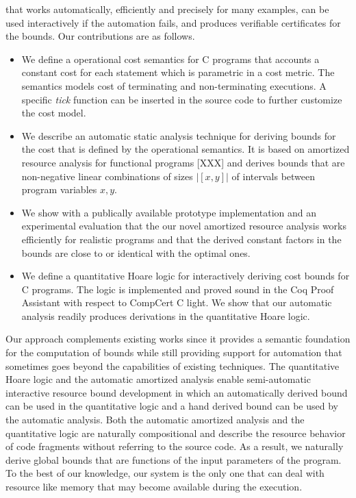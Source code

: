 \documentclass[nocopyrightspace,preprint]{sigplanconf}
\begin{document}
that works automatically, efficiently and precisely for many examples,
can be used interactively if the automation fails, and produces
verifiable certificates for the bounds.  Our contributions are as
follows.
%
\begin{itemize}
\item We define a operational cost semantics for C programs that
  accounts a constant cost for each statement which is parametric in a
  cost metric.  The semantics models cost of terminating and
  non-terminating executions.  A specific \emph{tick} function can be
  inserted in the source code to further customize the cost
  model.
\item We describe an automatic static analysis technique for deriving
  bounds for the cost that is defined by the operational semantics.
  It is based on amortized resource analysis for functional programs
  [XXX] and derives bounds that are non-negative linear combinations
  of sizes $|[x,y]|$ of intervals between program variables $x,y$.
\item We show with a publically available prototype implementation and
  an experimental evaluation that the our novel amortized resource
  analysis works efficiently for realistic programs and that the
  derived constant factors in the bounds are close to or identical
  with the optimal ones.
\item We define a quantitative Hoare logic for interactively deriving
  cost bounds for C programs.  The logic is implemented and proved
  sound in the Coq Proof Assistant with respect to CompCert C
  light.  We show that our automatic analysis readily produces
  derivations in the quantitative Hoare logic.
\end{itemize}
%
Our approach complements existing works since it provides a semantic
foundation for the computation of bounds while still providing support
for automation that sometimes goes beyond the capabilities of existing
techniques.  The quantitative Hoare logic and the automatic amortized
analysis enable semi-automatic interactive resource bound development
in which an automatically derived bound can be used in the
quantitative logic and a hand derived bound can be used by the
automatic analysis.  Both the automatic amortized analysis and the
quantitative logic are naturally compositional and describe the
resource behavior of code fragments without referring to the source
code.  As a result, we naturally derive global bounds that are
functions of the input parameters of the program.  To the best of our
knowledge, our system is the only one that can deal with resource like
memory that may become available during the execution.
\end{document}
